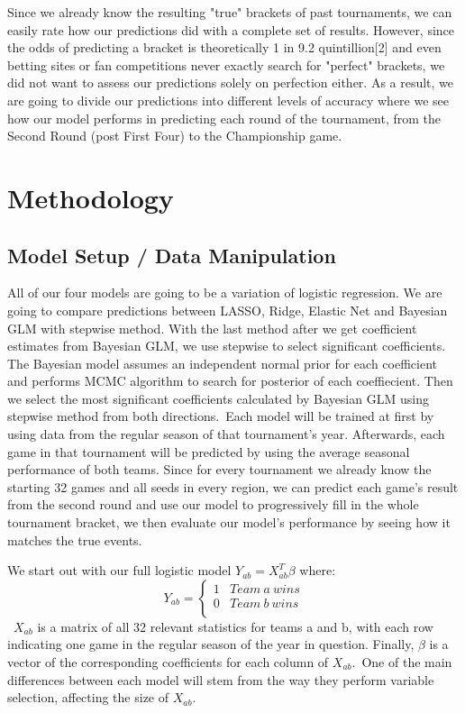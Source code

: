 \documentclass{article} %
\begin{document}
Since we already know the resulting "true" brackets of past tournaments, we can easily rate how our predictions did with a complete set of results. However, since the odds of predicting a bracket is theoretically 1 in 9.2 quintillion[2] and even betting sites or fan competitions never exactly search for "perfect" brackets, we did not want to assess our predictions solely on perfection either. As a result, we are going to divide our predictions into different levels of accuracy where we see how our model performs in predicting each round of the tournament, from the Second Round (post First Four) to the Championship game.

\section{Methodology}
\label{gen_inst}

\subsection{Model Setup / Data Manipulation}
All of our four models are going to be a variation of logistic regression. We are going to compare predictions between LASSO, Ridge, Elastic Net and Bayesian GLM with stepwise method. With the last method after we get coefficient estimates from Bayesian GLM, we use stepwise to select significant coefficients. The Bayesian model assumes an independent normal prior for each coefficient and performs MCMC algorithm to search for posterior of each coeffiecient. Then we select the most significant coefficients calculated by Bayesian GLM using stepwise method from both directions.\
Each model will be trained at first by using data from the regular season of that tournament's year. Afterwards, each game in that tournament will be predicted by using the average seasonal performance of both teams. Since for every tournament we already know the starting 32 games and all seeds in every region, we can predict each game's result from the second round and use our model to progressively fill in the whole tournament bracket, we then evaluate our model's performance by seeing how it matches the true events.

We start out with our full logistic model $Y_{ab} = X_{ab}^T \beta$ where:\
\[ Y_{ab} = \left\{
\begin{array}{ll}
1 & Team \ a \ wins \\
0 &  Team \ b \ wins \\
\end{array} 
\right. \]\
$X_{ab}$ is a matrix of all 32 relevant statistics for teams a and b, with each row indicating one game in the regular season of the year in question. Finally, $\beta$ is a vector of the corresponding coefficients for each column of $X_{ab}$.\ One of the main differences between each model will stem from the way they perform variable selection, affecting the size of $X_{ab}$.\\
\end{document}
